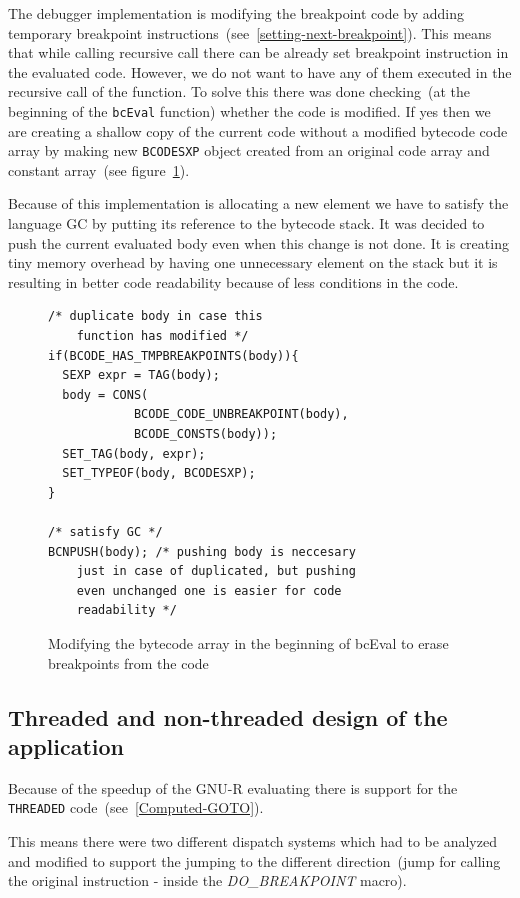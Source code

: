 \documentclass[thesis=M,english]{FITthesis}[2018/10/20]
\newcommand{\code}[1]{\texttt{#1}}
\begin{document}
{The debugger implementation is modifying the breakpoint code by adding temporary breakpoint instructions~(see~\ref{setting-next-breakpoint}). This means that while calling recursive call there can be already set breakpoint instruction in the evaluated code. However, we do not want to have any of them executed in the recursive call of the function. To solve this there was done checking~(at the beginning of the \code{bcEval} function) whether the code is modified. If yes then we are creating a shallow copy of the current code without a modified bytecode code array by making new \code{BCODESXP} object created from an original code array and constant array~(see figure~\ref{fig:erase-breakpoints-in-bceval}).

Because of this implementation is allocating a new element we have to satisfy the language GC by putting its reference to the bytecode stack. It was decided to push the current evaluated body even when this change is not done. It is creating tiny memory overhead by having one unnecessary element on the stack but it is resulting in better code readability because of less conditions in the code.

\begin{figure}[H]
\begin{lstlisting}
/* duplicate body in case this
	function has modified */
if(BCODE_HAS_TMPBREAKPOINTS(body)){
  SEXP expr = TAG(body);
  body = CONS(
            BCODE_CODE_UNBREAKPOINT(body),
            BCODE_CONSTS(body));
  SET_TAG(body, expr);
  SET_TYPEOF(body, BCODESXP);
}

/* satisfy GC */
BCNPUSH(body); /* pushing body is neccesary
	just in case of duplicated, but pushing
	even unchanged one is easier for code
    readability */

\end{lstlisting}
	\caption{Modifying the bytecode array in the beginning of bcEval to erase breakpoints from the code}\label{fig:erase-breakpoints-in-bceval}
\end{figure}

\subsection{Threaded and non-threaded design of the application}\label{threaded-and-non-threaded-design}

Because of the speedup of the GNU-R evaluating there is support for the \code{THREADED} code~(see~\ref{Computed-GOTO}).

This means there were two different dispatch systems which had to be analyzed and modified to support the jumping to the different direction~(jump for calling the original instruction - inside the \textit{DO{\_}BREAKPOINT} macro).

}
\end{document}
